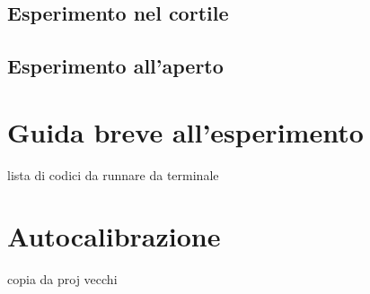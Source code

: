 \subsection{Esperimento nel cortile}

\subsection{Esperimento all'aperto}

\section{Guida breve all'esperimento}
lista di codici da runnare da terminale



\appendix
\section{Autocalibrazione}
copia da proj vecchi



\newpage




